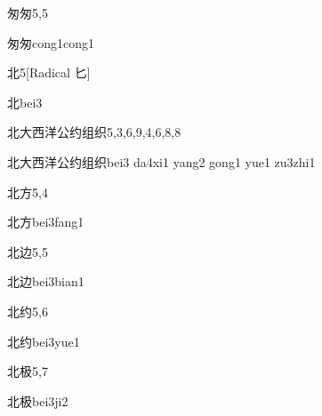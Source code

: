 \begin{entry}{匆匆}{5,5}
  \begin{phonetics}{匆匆}{cong1cong1}
  \end{phonetics}
\end{entry}

\begin{entry}{北}{5}[Radical 匕]
  \begin{phonetics}{北}{bei3}
  \end{phonetics}
\end{entry}

\begin{entry}{北大西洋公约组织}{5,3,6,9,4,6,8,8}
  \begin{phonetics}{北大西洋公约组织}{bei3 da4xi1 yang2 gong1 yue1 zu3zhi1}
  \end{phonetics}
\end{entry}

\begin{entry}{北方}{5,4}
  \begin{phonetics}{北方}{bei3fang1}
  \end{phonetics}
\end{entry}

\begin{entry}{北边}{5,5}
  \begin{phonetics}{北边}{bei3bian1}
  \end{phonetics}
\end{entry}

\begin{entry}{北约}{5,6}
  \begin{phonetics}{北约}{bei3yue1}
  \end{phonetics}
\end{entry}

\begin{entry}{北极}{5,7}
  \begin{phonetics}{北极}{bei3ji2}
  \end{phonetics}
\end{entry}

